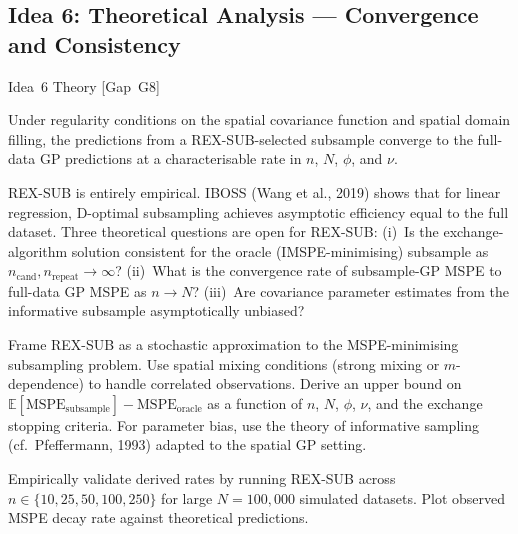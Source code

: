 \documentclass[12pt, a4paper]{article}
\begin{document}
\subsection{Idea 6: Theoretical Analysis --- Convergence and Consistency}

\begin{ideabox}{Idea~6 \textbullet{} Theory [Gap~G8]}

\begin{description}[leftmargin=5em, labelwidth=4.5em]
  \item[\textbf{Hypothesis}]
    Under regularity conditions on the spatial covariance function and spatial
    domain filling, the predictions from a REX-SUB-selected subsample converge
    to the full-data GP predictions at a characterisable rate in $n$, $N$, $\phi$,
    and $\nu$.

  \item[\textbf{Motivation}]
    REX-SUB is entirely empirical.  IBOSS (Wang et al., 2019) shows that for linear
    regression, D-optimal subsampling achieves asymptotic efficiency equal to the
    full dataset.  Three theoretical questions are open for REX-SUB:
    (i)~Is the exchange-algorithm solution consistent for the oracle
    (IMSPE-minimising) subsample as $n_{\text{cand}}, n_{\text{repeat}} \to \infty$?
    (ii)~What is the convergence rate of subsample-GP MSPE to full-data GP MSPE as
    $n \to N$?
    (iii)~Are covariance parameter estimates from the informative subsample
    asymptotically unbiased?

  \item[\textbf{Approach}]
    Frame REX-SUB as a stochastic approximation to the MSPE-minimising subsampling
    problem.  Use spatial mixing conditions (strong mixing or $m$-dependence) to
    handle correlated observations.  Derive an upper bound on
    $\mathbb{E}[\text{MSPE}_{\text{subsample}}] - \text{MSPE}_{\text{oracle}}$
    as a function of $n$, $N$, $\phi$, $\nu$, and the exchange stopping criteria.
    For parameter bias, use the theory of informative sampling (cf.\ Pfeffermann,
    1993) adapted to the spatial GP setting.

  \item[\textbf{Key experiment}]
    Empirically validate derived rates by running REX-SUB across
    $n \in \{10, 25, 50, 100, 250\}$ for large $N = 100{,}000$ simulated
    datasets.  Plot observed MSPE decay rate against theoretical predictions.


\end{description}
\end{ideabox}
\end{document}
